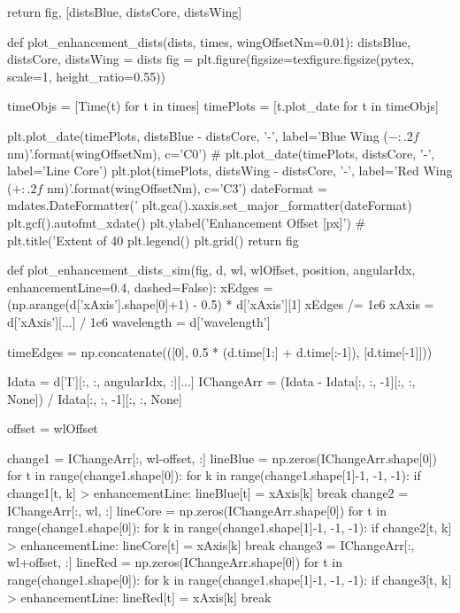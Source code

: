 \begin{pycode}[2DRT]
    return fig, [distsBlue, distsCore, distsWing]

def plot_enhancement_dists(dists, times, wingOffsetNm=0.01):
    distsBlue, distsCore, distsWing = dists
    fig = plt.figure(figsize=texfigure.figsize(pytex, scale=1, height_ratio=0.55))

    timeObjs = [Time(t) for t in times]
    timePlots = [t.plot_date for t in timeObjs]

    plt.plot_date(timePlots, distsBlue - distsCore, '-', label='Blue Wing ($-{:.2f}$ nm)'.format(wingOffsetNm), c='C0')
    # plt.plot_date(timePlots, distsCore, '-', label='Line Core')
    plt.plot(timePlots, distsWing - distsCore, '-', label='Red Wing ($+{:.2f}$ nm)'.format(wingOffsetNm), c='C3')
    dateFormat = mdates.DateFormatter('%
    plt.gca().xaxis.set_major_formatter(dateFormat)
    plt.gcf().autofmt_xdate()
    plt.ylabel('Enhancement Offset [px]')
#     plt.title('Extent of 40%
    plt.legend()
    plt.grid()
    return fig

def plot_enhancement_dists_sim(fig, d, wl, wlOffset, position,
                               angularIdx, enhancementLine=0.4, dashed=False):
    xEdges = (np.arange(d['xAxis'].shape[0]+1) - 0.5) * d['xAxis'][1]
    xEdges /= 1e6
    xAxis = d['xAxis'][...] / 1e6
    wavelength = d['wavelength']

    timeEdges = np.concatenate(([0],
                                0.5 * (d.time[1:] + d.time[:-1]),
                                [d.time[-1]]))

    Idata = d['I'][:, :, angularIdx, :][...]
    IChangeArr = (Idata - Idata[:, :, -1][:, :, None]) / Idata[:, :, -1][:, :, None]

    offset = wlOffset

    change1 = IChangeArr[:, wl-offset, :]
    lineBlue = np.zeros(IChangeArr.shape[0])
    for t in range(change1.shape[0]):
        for k in range(change1.shape[1]-1, -1, -1):
            if change1[t, k] > enhancementLine:
                lineBlue[t] = xAxis[k]
                break
    change2 = IChangeArr[:, wl, :]
    lineCore = np.zeros(IChangeArr.shape[0])
    for t in range(change1.shape[0]):
        for k in range(change1.shape[1]-1, -1, -1):
            if change2[t, k] > enhancementLine:
                lineCore[t] = xAxis[k]
                break
    change3 = IChangeArr[:, wl+offset, :]
    lineRed = np.zeros(IChangeArr.shape[0])
    for t in range(change1.shape[0]):
        for k in range(change1.shape[1]-1, -1, -1):
            if change3[t, k] > enhancementLine:
                lineRed[t] = xAxis[k]
                break


\end{pycode}
